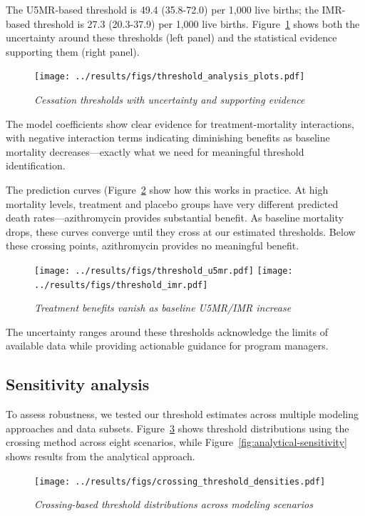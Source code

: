 \documentclass[11pt]{article}\usepackage[]{graphicx}\usepackage[]{xcolor}
\begin{document}
The U5MR-based threshold is 49.4 (35.8-72.0) per 1,000 live births; the IMR-based threshold is 27.3 (20.3-37.9) per 1,000 live births. Figure~\ref{fig:threshold-analysis} shows both the uncertainty around these thresholds (left panel) and the statistical evidence supporting them (right panel).

\begin{figure}[!h]
\centering
\texttt{[image: ../results/figs/threshold\_analysis\_plots.pdf]}
\caption{\emph{Cessation thresholds with uncertainty and supporting evidence}}
\label{fig:threshold-analysis}
\end{figure}

The model coefficients show clear evidence for treatment-mortality interactions, with negative interaction terms indicating diminishing benefits as baseline mortality decreases---exactly what we need for meaningful threshold identification.

\newpage
The prediction curves (Figure~\ref{fig:mortality-predictions} show how this works in practice. At high mortality levels, treatment and placebo groups have very different predicted death rates---azithromycin provides substantial benefit. As baseline mortality drops, these curves converge until they cross at our estimated thresholds. Below these crossing points, azithromycin provides no meaningful benefit.

\begin{figure}[!h]
\centering
\texttt{[image: ../results/figs/threshold\_u5mr.pdf]}
\texttt{[image: ../results/figs/threshold\_imr.pdf]}
\caption{\emph{Treatment benefits vanish as baseline U5MR/IMR increase}}
\label{fig:mortality-predictions}
\end{figure}

The uncertainty ranges around these thresholds acknowledge the limits of available data while providing actionable guidance for program managers.

\newpage
\subsection{Sensitivity analysis}

To assess robustness, we tested our threshold estimates across multiple modeling approaches and data subsets. Figure~\ref{fig:crossing-sensitivity} shows threshold distributions using the crossing method across eight scenarios, while Figure~\ref{fig:analytical-sensitivity} shows results from the analytical approach.

\begin{figure}[!h]
\centering
\texttt{[image: ../results/figs/crossing\_threshold\_densities.pdf]}
\caption{\emph{Crossing-based threshold distributions across modeling scenarios}}
\label{fig:crossing-sensitivity}
\end{figure}
\end{document}
